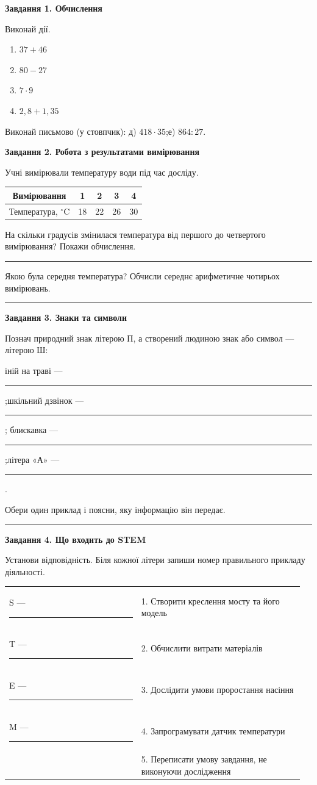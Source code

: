 \documentclass[10pt,a4paper]{article}
\newcommand{\answerline}[1]{\par\vspace{2pt}\rule{#1}{0.4pt}}
\begin{document}
\textbf{Завдання 1. Обчислення}

Виконай дії.
\begin{enumerate}[label=\alph*)]
  \item $37+46$
  \item $80-27$
  \item $7\cdot 9$
  \item $2{,}8+1{,}35$
\end{enumerate}

Виконай письмово (у стовпчик): д) $418\cdot35$;\quad е) $864:27$.

\textbf{Завдання 2. Робота з результатами вимірювання}

Учні вимірювали температуру води під час досліду.

\begin{center}
\begin{tabular}{|c|c|c|c|c|}
\hline
Вимірювання & 1 & 2 & 3 & 4 \\
\hline
Температура, $^\circ$C & 18 & 22 & 26 & 30 \\
\hline
\end{tabular}
\end{center}

На скільки градусів змінилася температура від першого до четвертого вимірювання? Покажи обчислення.
\answerline{\linewidth}

Якою була середня температура? Обчисли середнє арифметичне чотирьох вимірювань.
\answerline{\linewidth}

\textbf{Завдання 3. Знаки та символи}

Познач природний знак літерою П, а створений людиною знак або символ --- літерою Ш:

іній на траві --- \rule{0.8cm}{0.4pt};\quad шкільний дзвінок --- \rule{0.8cm}{0.4pt};\quad
блискавка --- \rule{0.8cm}{0.4pt};\quad літера «А» --- \rule{0.8cm}{0.4pt}.

Обери один приклад і поясни, яку інформацію він передає.
\answerline{\linewidth}

\textbf{Завдання 4. Що входить до STEM}

Установи відповідність. Біля кожної літери запиши номер правильного прикладу діяльності.

\begin{tabular}{@{}p{0.43\linewidth}p{0.53\linewidth}@{}}
S --- \rule{1cm}{0.4pt} & 1. Створити креслення мосту та його модель\\[3pt]
T --- \rule{1cm}{0.4pt} & 2. Обчислити витрати матеріалів\\[3pt]
E --- \rule{1cm}{0.4pt} & 3. Дослідити умови проростання насіння\\[3pt]
M --- \rule{1cm}{0.4pt} & 4. Запрограмувати датчик температури\\[3pt]
& 5. Переписати умову завдання, не виконуючи дослідження
\end{tabular}
\end{document}
